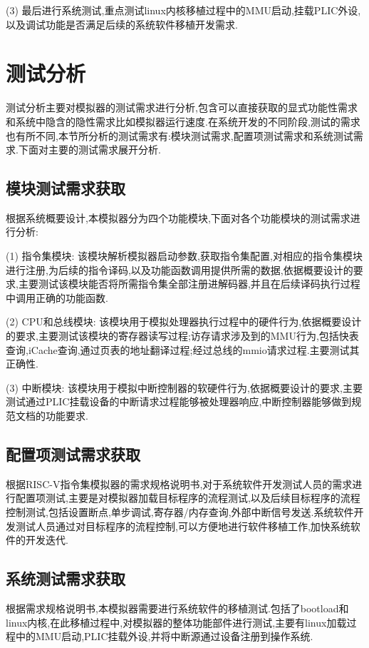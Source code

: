 (3) 最后进行系统测试,重点测试linux内核移植过程中的MMU启动,挂载PLIC外设,以及调试功能是否满足后续的系统软件移植开发需求.


\section{测试分析}
测试分析主要对模拟器的测试需求进行分析,包含可以直接获取的显式功能性需求和系统中隐含的隐性需求比如模拟器运行速度.在系统开发的不同阶段,测试的需求也有所不同,本节所分析的测试需求有:模块测试需求,配置项测试需求和系统测试需求.下面对主要的测试需求展开分析.

\subsection{模块测试需求获取}
根据系统概要设计,本模拟器分为四个功能模块,下面对各个功能模块的测试需求进行分析:


(1) 指令集模块: 该模块解析模拟器启动参数,获取指令集配置,对相应的指令集模块进行注册,为后续的指令译码,以及功能函数调用提供所需的数据,依据概要设计的要求,主要测试该模块能否将所需指令集全部注册进解码器,并且在后续译码执行过程中调用正确的功能函数.


(2) CPU和总线模块: 该模块用于模拟处理器执行过程中的硬件行为,依据概要设计的要求,主要测试该模块的寄存器读写过程;访存请求涉及到的MMU行为,包括快表查询,iCache查询,通过页表的地址翻译过程;经过总线的mmio请求过程.主要测试其正确性.


(3) 中断模块: 该模块用于模拟中断控制器的软硬件行为,依据概要设计的要求,主要测试通过PLIC挂载设备的中断请求过程能够被处理器响应,中断控制器能够做到规范文档的功能要求.


\subsection{配置项测试需求获取}
根据RISC-V指令集模拟器的需求规格说明书,对于系统软件开发测试人员的需求进行配置项测试,主要是对模拟器加载目标程序的流程测试,以及后续目标程序的流程控制测试,包括设置断点,单步调试,寄存器/内存查询,外部中断信号发送.系统软件开发测试人员通过对目标程序的流程控制,可以方便地进行软件移植工作,加快系统软件的开发迭代.

\subsection{系统测试需求获取}
根据需求规格说明书,本模拟器需要进行系统软件的移植测试.包括了bootload和linux内核,在此移植过程中,对模拟器的整体功能部件进行测试,主要有linux加载过程中的MMU启动,PLIC挂载外设,并将中断源通过设备注册到操作系统.

